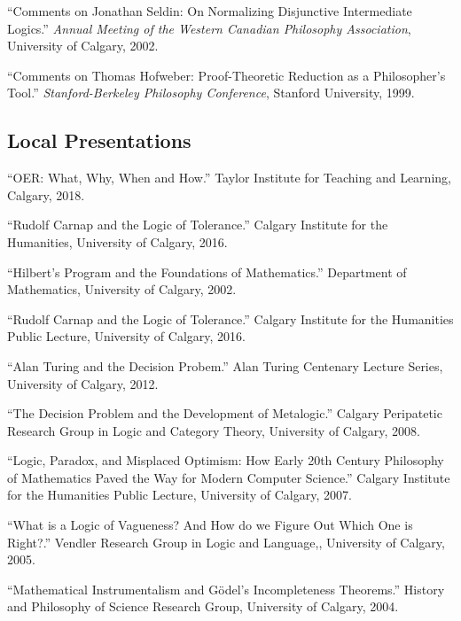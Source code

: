 \documentclass[11pt]{article}
\def\printdate#1{\xprintdate#1-}
\def\xprintdate#1-#2-#3-{#1}
\begin{document}
\ind ``Comments on Jonathan Seldin: On Normalizing Disjunctive Intermediate
Logics.'' \emph{Annual Meeting of the Western Canadian Philosophy Association}, University of Calgary, \printdate{2002-10-25}.


\ind ``Comments on Thomas Hofweber: Proof-Theoretic Reduction as a
Philosopher's Tool.'' \emph{Stanford-Berkeley Philosophy Conference}, Stanford University, \printdate{1999-05-01}.
















\subsection{Local Presentations}

\ind ``OER: What, Why, When and How.'' Taylor Institute for Teaching and Learning, Calgary, \printdate{2018-03-07}.

\ind ``Rudolf Carnap and the Logic of Tolerance.'' Calgary Institute for the Humanities, University of Calgary, \printdate{2016-02-23}.

\ind ``Hilbert's Program and the Foundations of Mathematics.'' Department of Mathematics, University of Calgary, \printdate{2002-03-07}.

\ind ``Rudolf Carnap and the Logic of Tolerance.'' Calgary Institute for the Humanities Public Lecture, University of Calgary, \printdate{2016-02-23}.

\ind ``Alan Turing and the Decision Probem.'' Alan Turing Centenary Lecture Series, University of Calgary, \printdate{2012-01-24}.

\ind ``The Decision Problem and the Development of Metalogic.'' Calgary Peripatetic Research Group in Logic and Category Theory, University of Calgary, \printdate{2008-09-024}.

\ind ``Logic, Paradox, and Misplaced Optimism: How Early 20th Century
Philosophy of Mathematics Paved the Way for Modern Computer Science.'' Calgary Institute for the Humanities Public Lecture, University of Calgary, \printdate{2007-02-09}.

\ind ``What is a Logic of Vagueness? And How do we Figure Out Which One is
Right?.'' Vendler Research Group in Logic and Language,, University of Calgary, \printdate{2005-11-24}.

\ind ``Mathematical Instrumentalism and Gödel's Incompleteness Theorems.'' History and Philosophy of Science Research Group, University of Calgary, \printdate{2004-01-15}.
\end{document}

